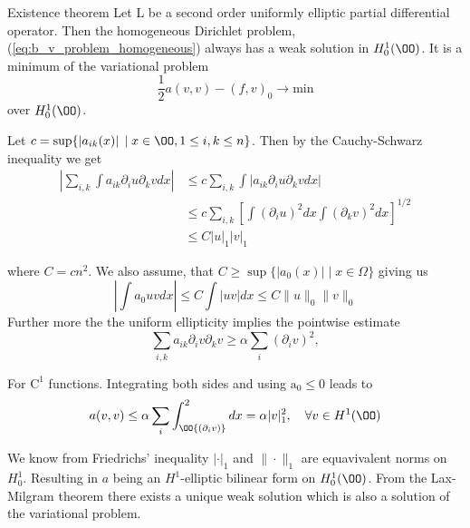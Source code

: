 \begin{thmx}{Existence theorem}
    Let L be a second order uniformly elliptic partial differential operator. Then the homogeneous Dirichlet problem,
     (\ref{eq:b_v_problem_homogeneous}) always has a weak solution in $H_0^1(\OO)$. It is a minimum of the variational problem
    \begin{equation}
        \frac{1}{2} a(v,v) - {(f, v)}_0 \rightarrow \text{min}
    \end{equation}
    over $H_0^1(\OO)$.
    \label{thm:existence_hom_dirichlet}
\end{thmx}

\begin{bev}
    Let $c = \sup\{\left| a_{ik}(x) \right| \; | \; x \in \OO, 1 \leq i,k \leq n\}$. Then by the Cauchy-Schwarz inequality we get
    \begin{align}
        \left| \sum_{i,k} \int a_{ik} \partial_i u \partial_k v dx \right| &\leq c \sum_{i,k} \int  \left| a_{ik} \partial_i u \partial_k v dx\right|\\
        &\leq c \sum_{i,k} {\left[ \int {\left( \partial_i u \right)}^2 dx \int {\left( \partial_k v \right)}^2 dx  \right]}^{1/2} \\
        &\leq C {\left| u \right|}_1 {\left| v \right|}_1
    \end{align}

    where $C=cn^2$. 
    We also assume, that $C\geq \sup\{|a_0(x)| \; | \; x\in \Omega\}$ giving us
    \[
        \left|\int a_0 u v dx \right| \leq C \int |u v| dx \leq C \|u\|_0 \|v\|_0      
    \]
    Further more the the uniform ellipticity implies the pointwise estimate
    \[
        \sum_{i,k} a_{ik} \partial_i v \partial_k v \geq \alpha \sum_i {\left( \partial_i v \right)}^2,
    \]

    For $\text{C}^1$ functions. Integrating both sides and using $\text{a}_0 \leq 0$ leads to
    \begin{equation}
        a(v,v) \leq \alpha \sum_i \int_\OO {\left(\partial_i v\right)}^2 dx = \alpha |v|^2_1, \quad \forall v \in H^1(\OO)
    \end{equation}

    We know from Friedrichs' inequality $|\cdot|_1$ and $\| \cdot \|_1$ are equavivalent norms on $H_0^1$. Resulting in $a$ being an $H^1$-elliptic bilinear form on $H_0^1(\OO)$.
    From the Lax-Milgram theorem there exists a unique weak solution which is also a solution of the variational problem.
\end{bev}